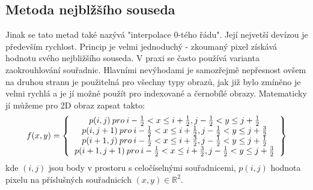\documentclass{thesis}%
\begin{document}
 \subsection{Metoda nejblžšího souseda}
Jinak se tato metad také nazývá "interpolace 0-tého řádu". Její nejvetší devízou je především rychlost. Princip je velmi jednoduchý - zkoumaný pixel získává hodnotu svého nejbližšího souseda. V praxi se často používá varianta zaokrouhlování souřadnic. Hlavními nevýhodami je samozřejmě nepřesnost ovšem na druhou stranu je použitelná pro všechny typy obrazů, jak již bylo zmíněno je velmi rychlá a je jí možné použít pro indexované a černobílé obrazy. Matematicky jí můžeme pro 2D obraz zapsat takto:
\begin{equation}
f(x,y) = \left\{
	\begin{tabular}{c}
                        $p(i,j)\: pro\: i - \frac{1}{2} < x \leq i+ \frac{1}{2},  j - \frac{1}{2} < y \leq j+ \frac{1}{2}$ \\
		   $p(i,j+1)\: pro\: i - \frac{1}{2} < x \leq i+ \frac{1}{2},  j - \frac{1}{2} < y \leq j+ \frac{3}{2}$\\
		   $p(i+1,j)\: pro\: i - \frac{1}{2} < x \leq i+ \frac{3}{2},  j - \frac{1}{2} < y \leq j+ \frac{1}{2}$\\ 
		   $p(i+1,j+1)\: pro\: i - \frac{1}{2} < x \leq i+ \frac{3}{2},  j - \frac{1}{2} < y \leq j+ \frac{3}{2}$
	\end{tabular}           
    \right\}
\end{equation}
kde $(i,j)$ jsou body v prostoru s celočíselnými souřadnicemi, $p(i,j)$ hodnota pixelu na příslušných souřadnicích $(x,y)\in \mathbb{R}^2$.
\end{document}
